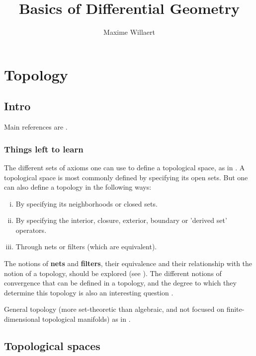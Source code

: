 \documentclass[a4paper,12pt,parskip=half*,chapterprefix=true,numbers=noendperiod]{scrreprt}
\title{Basics of Differential Geometry}
\author{Maxime Willaert}
\theoremstyle{definition}
\theoremstyle{remark}
\begin{document}
\maketitle

\tableofcontents

\part{Topology}

\chapter{Intro}

Main references are \cite{Munkres:Top,Lee:IntTopMan}.

\section{Things left to learn}

The different sets of axioms one can use to define a topological space, as in \cite{Wiki:AxiomTop}. A topological space is most commonly defined by specifying its open sets. But one can also define a topology in the following ways:
\begin{enumerate}[(i)]
	\item By specifying its neighborhoods or closed sets.
	\item By specifying the interior, closure, exterior, boundary or 'derived set' operators.
	\item Through nets or filters (which are equivalent).
\end{enumerate}
The notions of \textbf{nets} and \textbf{filters}, their equivalence and their relationship with the notion of a topology, should be explored (see \cite{Wiki:FiltersTop}). The different notions of convergence that can be defined in a topology, and the degree to which they determine this topology is also an interesting question \cite{Wiki:SequentialSpace,Wiki:ConvergenceSpace}.

General topology (more set-theoretic than algebraic, and not focused on finite-dimensional topological manifolds) as in \cite{Munkres:Top}.

\chapter{Topological spaces}
\end{document}
